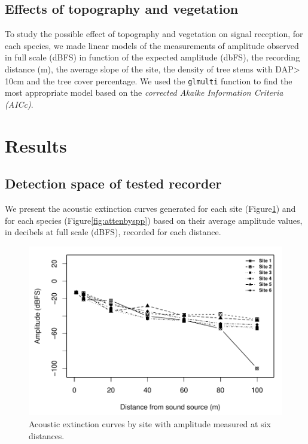 \documentclass[fleqn,10pt,lineno]{wlpeerj} %
\begin{document}
\hypertarget{effects-of-topography-and-vegetation}{%
\subsection*{Effects of topography and vegetation}\label{effects-of-topography-and-vegetation}}

To study the possible effect of topography and vegetation on signal reception, for each species, we made linear models of the measurements of amplitude observed in full scale (dBFS) in function of the expected amplitude (dbFS), the recording distance (m), the average slope of the site, the density of tree stems with DAP\textgreater{} 10cm and the tree cover percentage. We used the \texttt{glmulti} function to find the most appropriate model based on the \emph{corrected Akaike Information Criteria (AICc)}.

\hypertarget{results}{%
\section*{Results}\label{results}}

\hypertarget{detection-space-of-tested-recorder}{%
\subsection*{Detection space of tested recorder}\label{detection-space-of-tested-recorder}}

We present the acoustic extinction curves generated for each site (Figure\ref{fig:attenbysite}) and for each species (Figure\ref{fig:attenbyspp}) based on their average amplitude values, in decibels at full scale (dBFS), recorded for each distance.

\begin{figure}

{\centering \includegraphics[width=1\linewidth]{ASR_MyPaper_2020_files/figure-latex/attenbysite-1} 

}

\caption{Acoustic extinction curves by site with amplitude measured at six distances.\label{fig:attenbysite}}\label{fig:attenbysite}
\end{figure}
\end{document}
